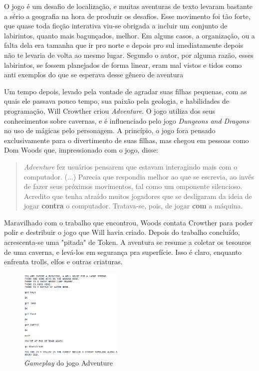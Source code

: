 O jogo é um desafio de localização, e muitas aventuras de texto levaram bastante
a sério a geografia na hora de produzir os desafios. Esse movimento foi tão
forte, que quase toda ficção interativa viu-se obrigada a incluir um conjunto de
labirintos, quanto mais bagunçados, melhor. Em alguns casos, a organização, ou a
falta dela era tamanha que ir pro norte e depois pro sul imediatamente depois não
te levaria de volta ao mesmo lugar. Segundo o autor, por alguma razão, esses
labirintos, se fossem planejados de forma linear, eram mal vistos e tidos como
anti exemplos do que se esperava desse gênero de aventura

Um tempo depois, levado pela vontade de agradar suas filhas pequenas,
com as quais ele passava pouco tempo, sua paixão pela geologia, e habilidades de
programação, Will Crowther criou \emph{Adventure}. O jogo utiliza dos seus
conhecimentos sobre cavernas, e é influenciado pelo jogo
\emph{Dungeons and Dragons} no uso de mágicas pelo personagem. A princípio, o
jogo fora pensado exclusivamente para o divertimento de suas filhas, mas chegou
em pessoas como Dom Woods que, impressionado com o jogo, disse:
\begin{quotation}
\emph{Adventure} fez usuários pensarem que estavam interagindo mais com o
computador. (...) Parecia que respondia melhor ao que se escrevia, ao invés de
fazer seus próximos movimentos, tal como um omponente silencioso. Acredito que
tenha atraído muitos jogadores que se desligaram da ideia de jogar
\textbf{contra} o computador. Tratava-se, pois, de jogar \textbf{com} a máquina.
\end{quotation}

Maravilhado com o trabalho que encontrou, Woods contata Crowther para poder
polir e destribuir o jogo que Will havia criado. Depois do trabalho concluído,
acrescenta-se uma "pitada" de Token. A aventura se resume a coletar os tesouros
de uma caverna, e levá-los em segurança pra superfície. Isso é claro, enquanto
enfrenta trolls, elfos e outras criaturas.

\begin{figure}[htb]
  \includegraphics[width=5cm]{figuras/adventure}
  \caption{\label{fig:adventure} \emph{Gameplay} do jogo Adventure}
\end{figure}

